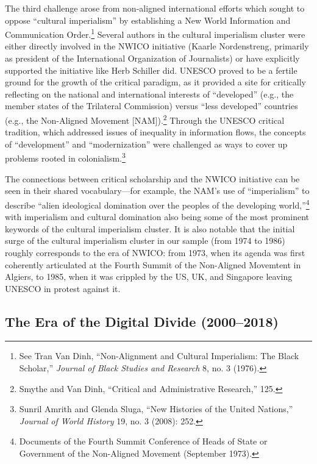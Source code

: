 \documentclass{tufte-handout}
\begin{document}
The third challenge arose from non-aligned international efforts which
sought to oppose ``cultural imperialism'' by establishing a New World
Information and Communication Order.\footnote{See Tran Van Dinh,
  ``Non-Alignment and Cultural Imperialism: The Black Scholar,''
  \emph{Journal of Black Studies and Research} 8, no. 3 (1976).} Several
authors in the cultural imperialism cluster were either directly
involved in the NWICO initiative (Kaarle Nordenstreng, primarily as
president of the International Organization of Journalists) or have
explicitly supported the initiative like Herb Schiller did. UNESCO
proved to be a fertile ground for the growth of the critical paradigm,
as it provided a site for critically reflecting on the national and
international interests of ``developed'' (e.g., the member states of the
Trilateral Commission) versus ``less developed'' countries (e.g., the
Non-Aligned Movement {[}NAM{]}).\footnote{Smythe and Van Dinh,
  ``Critical and Administrative Research,'' 125.} Through the UNESCO
critical tradition, which addressed issues of inequality in information
flows, the concepts of ``development'' and ``modernization'' were
challenged as ways to cover up problems rooted in
colonialism.\footnote{Sunril Amrith and Glenda Sluga, ``New Histories of
  the United Nations,'' \emph{Journal of World History} 19, no. 3
  (2008): 252.}

The connections between critical scholarship and the NWICO initiative
can be seen in their shared vocabulary---for example, the NAM's use of
``imperialism'' to describe ``alien ideological domination over the
peoples of the developing world,''\footnote{Documents of the Fourth
  Summit Conference of Heads of State or Government of the Non-Aligned
  Movement (September 1973).} with imperialism and cultural domination
also being some of the most prominent keywords of the cultural
imperialism cluster. It is also notable that the initial surge of the
cultural imperialism cluster in our sample (from 1974 to 1986) roughly
corresponds to the era of NWICO: from 1973, when its agenda was first
coherently articulated at the Fourth Summit of the Non-Aligned Movemtent
in Algiers, to 1985, when it was crippled by the US, UK, and Singapore
leaving UNESCO in protest against it.

\hypertarget{the-era-of-the-digital-divide-20002018}{%
\subsection{The Era of the Digital Divide
(2000--2018)}\label{the-era-of-the-digital-divide-20002018}}
\end{document}
